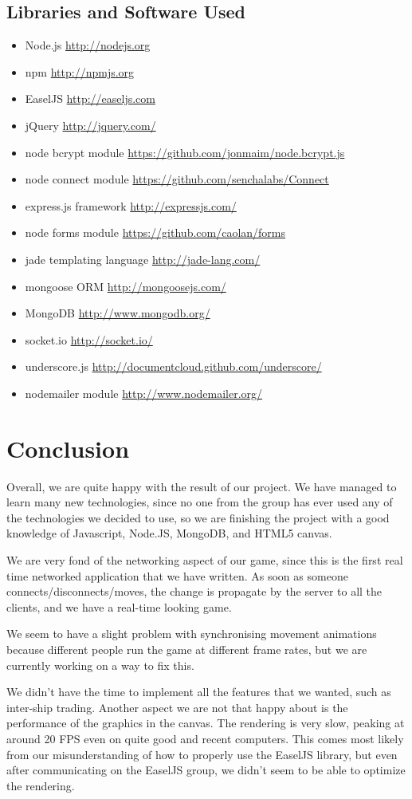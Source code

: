 \documentclass[a4paper,11pt]{article}
\begin{document}
		\subsection{Libraries and Software Used}
			\begin{itemize}
				\item Node.js \url{http://nodejs.org}
				\item npm \url{http://npmjs.org}
				\item EaselJS \url{http://easeljs.com}
				\item jQuery \url{http://jquery.com/}
				\item node bcrypt module \url{https://github.com/jonmaim/node.bcrypt.js}
				\item node connect module \url{https://github.com/senchalabs/Connect}
				\item express.js framework \url{http://expressjs.com/}
				\item node forms module \url{https://github.com/caolan/forms}
				\item jade templating language \url{http://jade-lang.com/}
				\item mongoose ORM \url{http://mongoosejs.com/}
				\item MongoDB \url{http://www.mongodb.org/}
				\item socket.io \url{http://socket.io/}
				\item underscore.js \url{http://documentcloud.github.com/underscore/}
				\item nodemailer module \url{http://www.nodemailer.org/}
			\end{itemize}
	
	\section{Conclusion}
	
	Overall, we are quite happy with the result of our project. We have managed to learn many new technologies, since no one from the group has ever used any of the technologies we decided to use, so we are finishing the project with a good knowledge of Javascript, Node.JS, MongoDB, and HTML5 canvas.
	
	We are very fond of the networking aspect of our game, since this is the first real time networked application that we have written. As soon as someone connects/disconnects/moves, the change is propagate by the server to all the clients, and we have a real-time looking game. 
	
	We seem to have a slight problem with synchronising movement animations because different people run the game at different frame rates, but we are currently working on a way to fix this.
	
	We didn't have the time to implement all the features that we wanted, such as inter-ship trading. Another aspect we are not that happy about is the performance of the graphics in the canvas. The rendering is very slow, peaking at around 20 FPS even on quite good and recent computers. This comes most likely from our misunderstanding of how to properly use the EaselJS library, but even after communicating on the EaselJS group, we didn't seem to be able to optimize the rendering.
	
	
	
\end{document}

